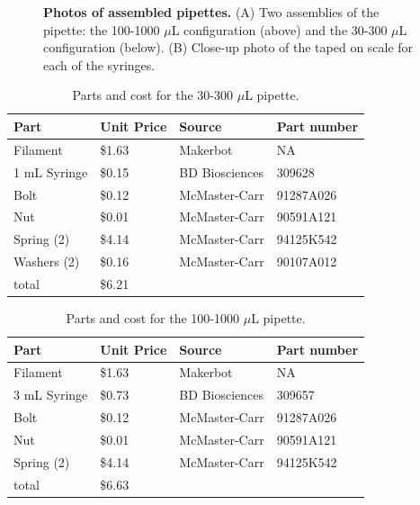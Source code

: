 \documentclass[10pt,letterpaper]{article}
\begin{document}
\begin{figure}
	\caption{
		{\bf Photos of assembled pipettes.}  (A) Two assemblies of the pipette: the 100-1000 $\mu$L configuration (above) and the 30-300 $\mu$L configuration (below). (B) Close-up photo of the taped on scale for each of the syringes. 
	}
	\label{fig3}
\end{figure}

\begin{table}[!ht]
\centering
\caption{Parts and cost for the 30-300 $\mu$L pipette.}
\label{table1}
\begin{tabular}{|l|l|l|l|}
	\hline
	Part         & Unit Price & Source         & Part number \\ \hline
	Filament     & \$1.63     & Makerbot       & NA          \\ \hline
	1 mL Syringe & \$0.15     & BD Biosciences & 309628      \\ \hline
	Bolt         & \$0.12     & McMaster-Carr  & 91287A026   \\ \hline
	Nut          & \$0.01     & McMaster-Carr  & 90591A121   \\ \hline
	Spring (2)   & \$4.14     & McMaster-Carr  & 94125K542   \\ \hline
	Washers (2)  & \$0.16     & McMaster-Carr  & 90107A012   \\ \hline
	total        & \$6.21     &                &             \\ \hline
\end{tabular}
\end{table}

\begin{table}[!ht]
\centering
\caption{Parts and cost for the 100-1000 $\mu$L pipette.}
\label{table2}
\begin{tabular}{|l|l|l|l|}
	\hline
	Part         & Unit Price & Source         & Part number \\ \hline
	Filament     & \$1.63     & Makerbot       & NA          \\ \hline
	3 mL Syringe & \$0.73     & BD Biosciences & 309657      \\ \hline
	Bolt         & \$0.12     & McMaster-Carr  & 91287A026   \\ \hline
	Nut          & \$0.01     & McMaster-Carr  & 90591A121   \\ \hline
	Spring (2)   & \$4.14     & McMaster-Carr  & 94125K542   \\ \hline
	total        & \$6.63     &                &             \\ \hline
\end{tabular}
\end{table}
\end{document}
